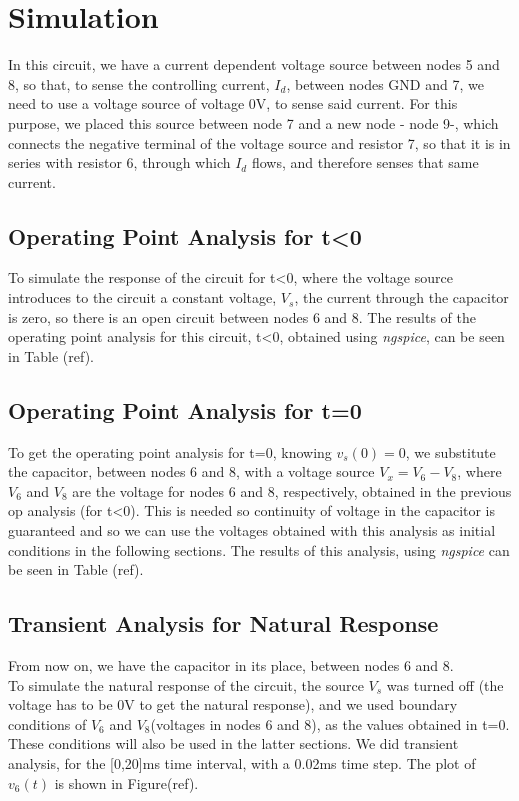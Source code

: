 \section{Simulation}
\label{sec:simulation}
In this circuit, we have a current dependent voltage source between nodes 5 and 8, so that, to sense the controlling current, $I_d$, between nodes GND and 7, we need to use a voltage source of voltage 0V, to sense said current. For this purpose, we placed this source between node 7 and a new node - node 9-, which connects the negative terminal of the voltage source and resistor 7, so that it is in series with resistor 6, through which $I_d$ flows, and therefore senses that same current.\\
\subsection{Operating Point Analysis for t\textless0}
To simulate the response of the circuit for t\textless0, where the voltage source introduces to the circuit a constant voltage, $V_s$, the current through the capacitor is zero, so there is an open circuit between nodes 6 and 8. The results of the operating point analysis for this circuit, t\textless0, obtained using \textit{ngspice}, can be seen in Table (ref).\\

\subsection{Operating Point Analysis for t=0}
To get the operating point analysis for t=0, knowing $v_s(0)=0$, we substitute the capacitor, between nodes 6 and 8, with a voltage source $V_x=V_6-V_8$, where $V_6$ and $V_8$ are the voltage for nodes 6 and 8, respectively, obtained in the previous op analysis (for t\textless0). This is needed so continuity of voltage in the capacitor is guaranteed and so we can use the voltages obtained with this analysis as initial conditions in the following sections. The results of this analysis, using \textit{ngspice} can be seen in Table (ref).\\
\subsection{Transient Analysis for Natural Response}
From now on, we have the capacitor in its place, between nodes 6 and 8.\\
To simulate the natural response of the circuit, the source $V_s$ was turned off (the voltage has to be 0V to get the natural response), and we used boundary conditions of $V_6$ and $V_8$(voltages in nodes 6 and 8), as the values obtained in t=0. These conditions will also be used in the latter sections. We did transient analysis, for the [0,20]ms time interval, with a 0.02ms time step. The plot of $v_{6}(t)$ is shown in Figure(ref).\\
